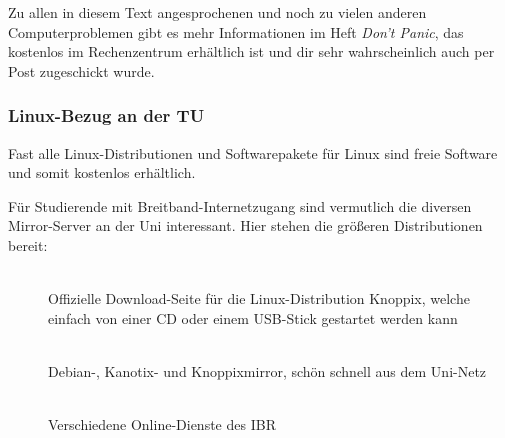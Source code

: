 		Zu allen in diesem Text angesprochenen und noch zu vielen anderen Computerproblemen gibt es mehr Informationen im Heft \emph{Don't Panic}, das kostenlos im Rechenzentrum erhältlich ist und dir sehr wahrscheinlich auch per Post zugeschickt wurde.

	\subsubsection{Linux-Bezug an der TU}
		Fast alle Linux-Distributionen und Softwarepakete für Linux sind freie Software und somit kostenlos erhältlich.

		Für Studierende mit Breitband-Internetzugang sind vermutlich die diversen Mirror-Server an der Uni interessant. Hier stehen die größeren Distributionen bereit:

		\begin{description}
			\item[]~\\Offizielle Download-Seite für die Linux-Distribution Knoppix, welche einfach von einer CD oder einem USB-Stick gestartet werden kann
			\item[]~\\Debian-, Kanotix- und Knoppixmirror, schön schnell aus dem Uni-Netz
			\item[]~\\Verschiedene Online-Dienste des IBR
		\end{description}

